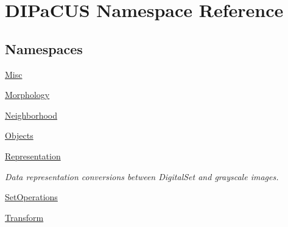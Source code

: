\hypertarget{namespaceDIPaCUS}{}\section{D\+I\+Pa\+C\+US Namespace Reference}
\label{namespaceDIPaCUS}
\subsection*{Namespaces}
\begin{DoxyCompactItemize}
\item 
 \mbox{\hyperlink{namespaceDIPaCUS_1_1Misc}{Misc}}
\item 
 \mbox{\hyperlink{namespaceDIPaCUS_1_1Morphology}{Morphology}}
\item 
 \mbox{\hyperlink{namespaceDIPaCUS_1_1Neighborhood}{Neighborhood}}
\item 
 \mbox{\hyperlink{namespaceDIPaCUS_1_1Objects}{Objects}}
\item 
 \mbox{\hyperlink{namespaceDIPaCUS_1_1Representation}{Representation}}
\begin{DoxyCompactList}\small\item\em Data representation conversions between Digital\+Set and grayscale images. \end{DoxyCompactList}\item 
 \mbox{\hyperlink{namespaceDIPaCUS_1_1SetOperations}{Set\+Operations}}
\item 
 \mbox{\hyperlink{namespaceDIPaCUS_1_1Transform}{Transform}}
\end{DoxyCompactItemize}
